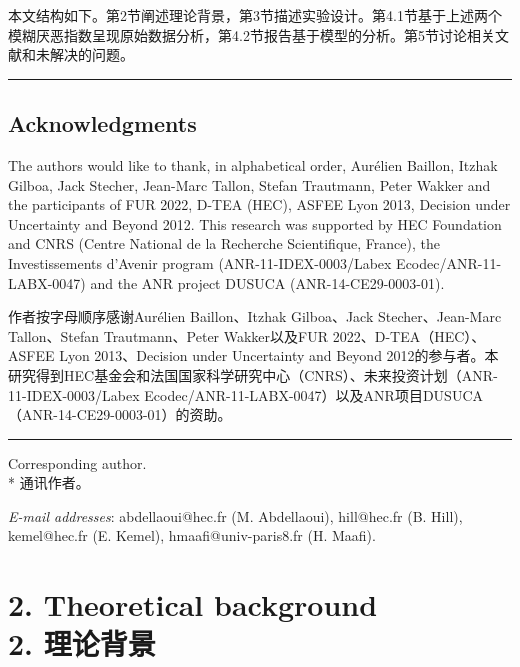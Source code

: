\documentclass[12pt,a4paper]{article}
\newenvironment{original}
  {\par\vspace{0.5em}\noindent\color{black}\ignorespaces}
  {\par\vspace{0.3em}}
\newenvironment{translation}
  {\par\noindent\color{transblue}\ignorespaces}
  {\par\vspace{0.8em}\hrule\vspace{0.5em}}
\newcommand{\bilingualsection}[2]{%
  \section{\texorpdfstring{#1 \\[0.3em] {\large\color{transblue}#2}}{#1}}
}
\begin{document}
\begin{translation}
本文结构如下。第2节阐述理论背景，第3节描述实验设计。第4.1节基于上述两个模糊厌恶指数呈现原始数据分析，第4.2节报告基于模型的分析。第5节讨论相关文献和未解决的问题。
\end{translation}

\subsection*{Acknowledgments}

\begin{original}
The authors would like to thank, in alphabetical order, Aur\'{e}lien Baillon, Itzhak Gilboa, Jack Stecher, Jean-Marc Tallon, Stefan Trautmann, Peter Wakker and the participants of FUR 2022, D-TEA (HEC), ASFEE Lyon 2013, Decision under Uncertainty and Beyond 2012. This research was supported by HEC Foundation and CNRS (Centre National de la Recherche Scientifique, France), the Investissements d'Avenir program (ANR-11-IDEX-0003/Labex Ecodec/ANR-11-LABX-0047) and the ANR project DUSUCA (ANR-14-CE29-0003-01).
\end{original}

\begin{translation}
作者按字母顺序感谢Aur\'{e}lien Baillon、Itzhak Gilboa、Jack Stecher、Jean-Marc Tallon、Stefan Trautmann、Peter Wakker以及FUR 2022、D-TEA（HEC）、ASFEE Lyon 2013、Decision under Uncertainty and Beyond 2012的参与者。本研究得到HEC基金会和法国国家科学研究中心（CNRS）、未来投资计划（ANR-11-IDEX-0003/Labex Ecodec/ANR-11-LABX-0047）以及ANR项目DUSUCA（ANR-14-CE29-0003-01）的资助。
\end{translation}

\vspace{0.5em}
\noindent * Corresponding author. \\
{\color{transblue} * 通讯作者。}

\vspace{0.3em}
\noindent \textit{E-mail addresses}: abdellaoui@hec.fr (M. Abdellaoui), hill@hec.fr (B. Hill), kemel@hec.fr (E. Kemel), hmaafi@univ-paris8.fr (H. Maafi).

\newpage%
\bilingualsection{2. Theoretical background}{2. 理论背景}
\end{document}
